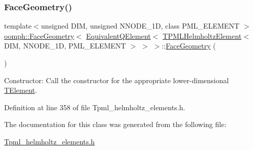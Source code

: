 \subsubsection{\texorpdfstring{Face\+Geometry()}{FaceGeometry()}}
{\footnotesize\ttfamily template$<$unsigned D\+IM, unsigned N\+N\+O\+D\+E\+\_\+1D, class P\+M\+L\+\_\+\+E\+L\+E\+M\+E\+NT $>$ \\
\hyperlink{classoomph_1_1FaceGeometry}{oomph\+::\+Face\+Geometry}$<$ \hyperlink{classoomph_1_1EquivalentQElement}{Equivalent\+Q\+Element}$<$ \hyperlink{classoomph_1_1TPMLHelmholtzElement}{T\+P\+M\+L\+Helmholtz\+Element}$<$ D\+IM, N\+N\+O\+D\+E\+\_\+1D, P\+M\+L\+\_\+\+E\+L\+E\+M\+E\+NT $>$ $>$ $>$\+::\hyperlink{classoomph_1_1FaceGeometry}{Face\+Geometry} (\begin{DoxyParamCaption}{ }\end{DoxyParamCaption})\hspace{0.3cm}{\ttfamily [inline]}}



Constructor\+: Call the constructor for the appropriate lower-\/dimensional \hyperlink{classoomph_1_1TElement}{T\+Element}. 



Definition at line 358 of file Tpml\+\_\+helmholtz\+\_\+elements.\+h.



The documentation for this class was generated from the following file\+:\begin{DoxyCompactItemize}
\item 
\hyperlink{Tpml__helmholtz__elements_8h}{Tpml\+\_\+helmholtz\+\_\+elements.\+h}\end{DoxyCompactItemize}
